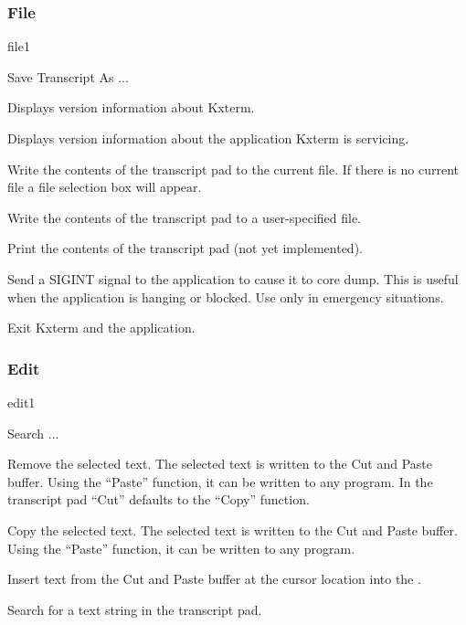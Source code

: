 
\subsubsection{File}

\begin{PAWf}{file1}
\begin{DLsf}{Save Transcript As ...}
\item[About Kxterm...]
         Displays version information about Kxterm.
\item[About <Application>...]
         Displays version information about the application
         Kxterm is servicing.
\item[Save Transcript]
         Write the contents of the transcript pad to the current
         file. If there is no current file a file selection box
         will appear.
\item[Save Transcript As...]
         Write the contents of the transcript pad to a user-specified
         file.
\item[Print...]
         Print the contents of the transcript pad (not yet implemented).
\item[Kill]
         Send a SIGINT signal to the application to cause it to
         core dump. This is useful when the application is hanging or
         blocked. Use only in emergency situations.
\item[Exit]
         Exit Kxterm and the application.
\end{DLsf}
\end{PAWf}

\subsubsection{Edit}
\begin{PAWf}{edit1}
\begin{DLsf}{Search ...}
\item[Cut]
         Remove the selected text. The selected text is written to the
         Cut and Paste buffer. Using the ``Paste'' function, it can be
         written to any  program. In the transcript pad ``Cut''
         defaults to the ``Copy'' function.
\item[Copy]
         Copy the selected text. The selected text is written to the
         Cut and Paste buffer. Using the ``Paste'' function, it can be
         written to any  program.
\item[Paste]
         Insert text from the Cut and Paste buffer at the cursor location
         into the \IP.
\item[Search...]
         Search for a text string in the transcript pad.
\end{DLsf}
\end{PAWf}

